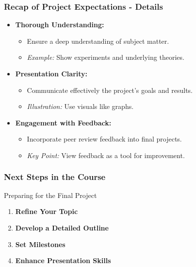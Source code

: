 \documentclass{beamer}
\begin{document}
\begin{frame}[fragile]
    \frametitle{Recap of Project Expectations - Details}
    \begin{itemize}
        \item \textbf{Thorough Understanding:}
          \begin{itemize}
              \item Ensure a deep understanding of subject matter.
              \item \textit{Example:} Show experiments and underlying theories.
          \end{itemize}
          
        \item \textbf{Presentation Clarity:}
          \begin{itemize}
              \item Communicate effectively the project’s goals and results.
              \item \textit{Illustration:} Use visuals like graphs.
          \end{itemize}
          
        \item \textbf{Engagement with Feedback:}
          \begin{itemize}
              \item Incorporate peer review feedback into final projects.
              \item \textit{Key Point:} View feedback as a tool for improvement.
          \end{itemize}
    \end{itemize}
\end{frame}

\begin{frame}[fragile]
    \frametitle{Next Steps in the Course}
    \begin{block}{Preparing for the Final Project}
        \begin{enumerate}
            \item \textbf{Refine Your Topic}
            \item \textbf{Develop a Detailed Outline}
            \item \textbf{Set Milestones}
            \item \textbf{Enhance Presentation Skills}
        \end{enumerate}
    \end{block}
\end{frame}
\end{document}
